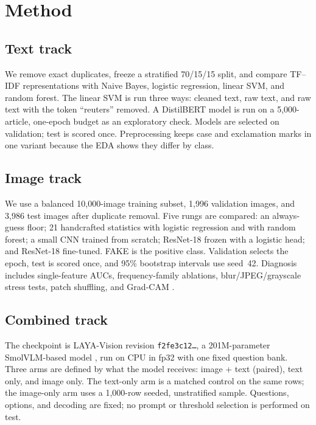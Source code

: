 \documentclass[11pt]{article}
\begin{document}
\section{Method}

\subsection{Text track}

We remove exact duplicates, freeze a stratified 70/15/15 split, and compare TF--IDF representations with Naive Bayes, logistic regression, linear SVM, and random forest. The linear SVM is run three ways: cleaned text, raw text, and raw text with the token ``reuters'' removed. A DistilBERT model is run on a 5{,}000-article, one-epoch budget as an exploratory check. Models are selected on validation; test is scored once. Preprocessing keeps case and exclamation marks in one variant because the EDA shows they differ by class.

\subsection{Image track}

We use a balanced 10{,}000-image training subset, 1{,}996 validation images, and 3{,}986 test images after duplicate removal. Five rungs are compared: an always-guess floor; 21 handcrafted statistics with logistic regression and with random forest; a small CNN trained from scratch; ResNet-18 \cite{resnet} frozen with a logistic head; and ResNet-18 fine-tuned. FAKE is the positive class. Validation selects the epoch, test is scored once, and 95\% bootstrap intervals use seed~42. Diagnosis includes single-feature AUCs, frequency-family ablations, blur/JPEG/grayscale stress tests, patch shuffling, and Grad-CAM \cite{gradcam}.

\subsection{Combined track}

The checkpoint is LAYA-Vision revision \texttt{f2fe3c12\ldots}, a 201M-parameter SmolVLM-based model \cite{smolvlm}, run on CPU in fp32 with one fixed question bank. Three arms are defined by what the model receives: image + text (paired), text only, and image only. The text-only arm is a matched control on the same rows; the image-only arm uses a 1{,}000-row seeded, unstratified sample. Questions, options, and decoding are fixed; no prompt or threshold selection is performed on test.
\end{document}
